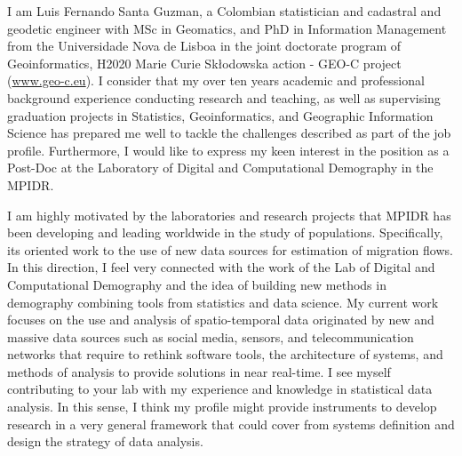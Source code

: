 \documentclass[11pt, a4paper]{awesome-cv}
\begin{document}
\makecvheader[R]


\makelettertitle

\begin{cvletter}
I am Luis Fernando Santa Guzman, a Colombian statistician and cadastral and geodetic engineer with MSc in Geomatics, and PhD in Information Management from the Universidade Nova de Lisboa in the joint doctorate program of Geoinformatics, H2020 Marie Curie Skłodowska action - GEO-C project (\url{www.geo-c.eu}). I consider that my over ten years academic and professional background experience conducting research and teaching, as well as supervising graduation projects in Statistics, Geoinformatics, and Geographic Information Science has prepared me well to tackle the challenges described as part of the job profile. Furthermore, I would like to express my keen interest in the position as a Post-Doc at the Laboratory of Digital and Computational Demography in the MPIDR.\par
I am highly motivated by the laboratories and research projects that MPIDR has been developing and leading worldwide in the study of populations. Specifically, its oriented work to the use of new data sources for estimation of migration flows. In this direction, I feel very connected with the work of the Lab of Digital and Computational Demography and the idea of building new methods in demography combining tools from statistics and data science. My current work focuses on the use and analysis of spatio-temporal data originated by new and massive data sources such as social media, sensors, and telecommunication networks that require to rethink software tools, the architecture of systems, and methods of analysis to provide solutions in near real-time. I see myself contributing to your lab with my experience and knowledge in statistical data analysis. In this sense, I think my profile might provide instruments to develop research in a very general framework that could cover from systems definition and design the strategy of data analysis.\par

\end{cvletter}
\end{document}
